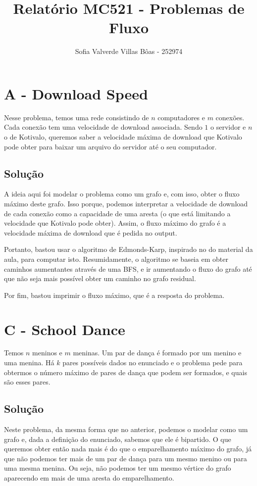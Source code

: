 \documentclass[12pt,a4paper]{article}
\title{Relatório MC521 -  Problemas de Fluxo}
\author{Sofia Valverde Villas Bôas - 252974}
\begin{document}
\maketitle

\section*{A - Download Speed}

Nesse problema, temos uma rede consistindo de $n$ computadores e $m$ conexões. 
Cada conexão tem uma velocidade de download associada. Sendo $1$ o servidor e $n$ o de 
Kotivalo, queremos saber a velocidade máxima de download que Kotivalo pode obter para baixar um arquivo do
servidor até o seu computador.

\subsection*{Solução}

A ideia aqui foi modelar o problema como um grafo e, com isso, obter o fluxo máximo deste grafo.
Isso porque, podemos interpretar a velocidade de download de cada conexão como a capacidade de uma aresta (o que está limitando
a velocidade que Kotivalo pode obter). Assim, o fluxo máximo do grafo é a velocidade máxima de download que é pedida no output.

Portanto, bastou usar o algoritmo de Edmonds-Karp, inspirado no do material da aula, para computar isto.
Resumidamente, o algoritmo se baseia em obter caminhos aumentantes através de uma BFS,
e ir aumentando o fluxo do grafo até que não seja mais possível obter um caminho no grafo residual. 

Por fim, bastou imprimir o fluxo máximo, que é a resposta do problema.
\section*{C - School Dance}

Temos $n$ meninos e $m$ meninas. Um par de dança é formado por um menino e uma menina.
Há $k$ pares possíveis dados no enunciado e o problema pede para obtermos o número máximo de pares de dança que podem ser formados,
e quais são esses pares.

\subsection*{Solução}

Neste problema, da mesma forma que no anterior, podemos o modelar como um grafo e, dada a definição do enunciado,
sabemos que ele é bipartido. O que queremos obter então nada mais é do que o emparelhamento máximo do grafo, já que
não podemos ter mais de um par de dança para um mesmo menino ou para uma mesma menina. Ou seja, não podemos ter um 
mesmo vértice do grafo aparecendo em mais de uma aresta do emparelhamento.
\end{document}
